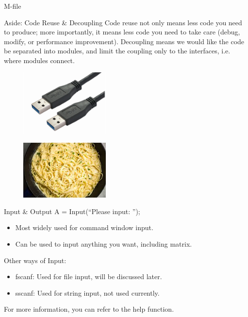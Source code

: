 \begin{frame}{M-file}

\begin{block}{Aside: Code Reuse \& Decoupling\footnotemark}
Code reuse not only means less code you need to produce; more importantly, it means less code you need to take care (debug, modify, or performance improvement). Decoupling means we would like the code be separated into modules, and limit the coupling only to the interfaces, i.e. where modules connect.
\end{block}
\begin{minipage}{0.48\textwidth}
	\begin{figure}
		\centering
		\includegraphics[width=0.4\textwidth]{pic/low-coupling.jpg}
	\end{figure}
\end{minipage}
\begin{minipage}{0.48\textwidth}
	\begin{figure}
		\centering
		\includegraphics[width=0.4\textwidth]{pic/high-coupling.jpg}
	\end{figure}
\end{minipage}
\end{frame}

\begin{frame}{Input \& Output}
A = Input(``Please input: '');
\begin{itemize}
\item Most widely used for command window input.
\item Can be used to input anything you want, including matrix.
\end{itemize}
Other ways of Input: 
\begin{itemize}
\item fscanf: Used for file input, will be discussed later.
\item sscanf: Used for string input, not used currently.
\end{itemize}
For more information, you can refer to the help function.
\end{frame}

